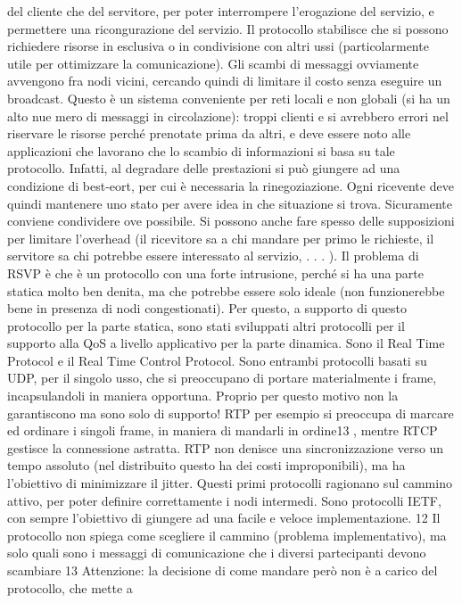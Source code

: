 del cliente che del servitore, per poter interrompere l'erogazione del servizio,
e permettere una ricongurazione del servizio. Il protocollo stabilisce che si
possono richiedere risorse in esclusiva o in condivisione con altri ussi (particolarmente utile per ottimizzare la
comunicazione). Gli scambi di messaggi
ovviamente avvengono fra nodi vicini, cercando quindi di limitare il costo senza
eseguire un broadcast.
Questo è un sistema conveniente per reti locali e non globali (si ha un alto nue
mero di messaggi in circolazione): troppi clienti e si avrebbero errori nel riservare
le risorse perché prenotate prima da altri, e deve essere noto alle applicazioni
che lavorano che lo scambio di informazioni si basa su tale protocollo. Infatti,
al degradare delle prestazioni si può giungere ad una condizione di best-eort,
per cui è necessaria la rinegoziazione. Ogni ricevente deve quindi mantenere
uno stato per avere idea in che situazione si trova. Sicuramente conviene condividere ove possibile. Si possono anche
fare spesso delle supposizioni per limitare
l'overhead (il ricevitore sa a chi mandare per primo le richieste, il servitore sa
chi potrebbe essere interessato al servizio, . . . ).
Il problema di RSVP è che è un protocollo con una forte intrusione, perché si
ha una parte statica molto ben denita, ma che potrebbe essere solo ideale (non
funzionerebbe bene in presenza di nodi congestionati). Per questo, a supporto
di questo protocollo per la parte statica, sono stati sviluppati altri protocolli
per il supporto alla QoS a livello applicativo per la parte dinamica. Sono il Real
Time Protocol e il Real Time Control Protocol. Sono entrambi protocolli basati
su UDP, per il singolo usso, che si preoccupano di portare materialmente i
frame, incapsulandoli in maniera opportuna. Proprio per questo motivo non
la garantiscono ma sono solo di supporto! RTP per esempio si preoccupa di
marcare ed ordinare i singoli frame, in maniera di mandarli in ordine13 , mentre
RTCP gestisce la connessione astratta.
RTP non denisce una sincronizzazione verso un tempo assoluto (nel distribuito questo ha dei costi improponibili), ma ha
l'obiettivo di minimizzare il
jitter. Questi primi protocolli ragionano sul cammino attivo, per poter definire
correttamente i nodi intermedi. Sono protocolli IETF, con sempre l'obiettivo di
giungere ad una facile e veloce implementazione.
12 Il protocollo non spiega come scegliere il cammino (problema implementativo), ma solo
quali sono i messaggi di comunicazione che i diversi partecipanti devono scambiare
13 Attenzione: la decisione di come mandare però non è a carico del protocollo, che mette a

